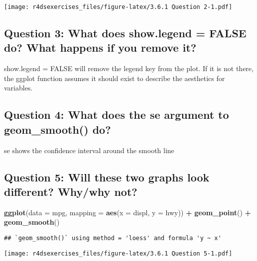 \documentclass[
]{book}
\newenvironment{Shaded}{\begin{snugshade}}{\end{snugshade}}
\newcommand{\DataTypeTok}[1]{\textcolor[rgb]{0.13,0.29,0.53}{#1}}
\newcommand{\KeywordTok}[1]{\textcolor[rgb]{0.13,0.29,0.53}{\textbf{#1}}}
\newcommand{\NormalTok}[1]{#1}
\newcommand{\OperatorTok}[1]{\textcolor[rgb]{0.81,0.36,0.00}{\textbf{#1}}}
\newcommand{\StringTok}[1]{\textcolor[rgb]{0.31,0.60,0.02}{#1}}
\begin{document}
\texttt{[image: r4dsexercises\_files/figure-latex/3.6.1 Question 2-1.pdf]}

\hypertarget{question-3-what-does-show.legend-false-do-what-happens-if-you-remove-it}{%
\subsection{Question 3: What does show.legend = FALSE do? What happens if you remove it?}\label{question-3-what-does-show.legend-false-do-what-happens-if-you-remove-it}}

show.legend = FALSE will remove the legend key from the plot. If it is not there, the ggplot function assumes it should exist to describe the aesthetics for variables.

\hypertarget{question-4-what-does-the-se-argument-to-geom_smooth-do}{%
\subsection{Question 4: What does the se argument to geom\_smooth() do?}\label{question-4-what-does-the-se-argument-to-geom_smooth-do}}

se shows the confidence interval around the smooth line

\hypertarget{question-5-will-these-two-graphs-look-different-whywhy-not}{%
\subsection{Question 5: Will these two graphs look different? Why/why not?}\label{question-5-will-these-two-graphs-look-different-whywhy-not}}

\begin{Shaded}
\begin{Highlighting}[]
\KeywordTok{ggplot}\NormalTok{(}\DataTypeTok{data =}\NormalTok{ mpg, }\DataTypeTok{mapping =} \KeywordTok{aes}\NormalTok{(}\DataTypeTok{x =}\NormalTok{ displ, }\DataTypeTok{y =}\NormalTok{ hwy)) }\OperatorTok{+}\StringTok{ }
\StringTok{  }\KeywordTok{geom_point}\NormalTok{() }\OperatorTok{+}\StringTok{ }
\StringTok{  }\KeywordTok{geom_smooth}\NormalTok{()}
\end{Highlighting}
\end{Shaded}

\begin{verbatim}
## `geom_smooth()` using method = 'loess' and formula 'y ~ x'
\end{verbatim}

\texttt{[image: r4dsexercises\_files/figure-latex/3.6.1 Question 5-1.pdf]}
\end{document}
